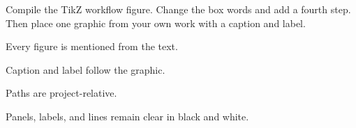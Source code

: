 \begin{codelab}
Compile the TikZ workflow figure. Change the box words and add a fourth step.
Then place one graphic from your own work with a caption and label.
\end{codelab}

\begin{chapterchecklist}
  \item Every figure is mentioned from the text.
  \item Caption and label follow the graphic.
  \item Paths are project-relative.
  \item Panels, labels, and lines remain clear in black and white.
\end{chapterchecklist}
